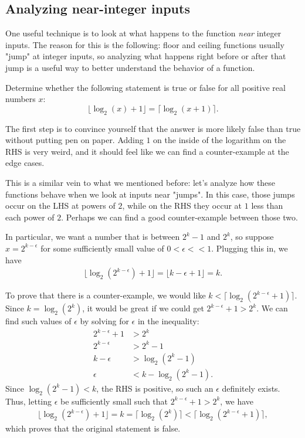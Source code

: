 \documentclass{article}
\begin{document}
\subsection{Analyzing near-integer inputs}

One useful technique is to look at what happens to the function \emph{near} integer inputs. The reason for this is the following: floor and ceiling functions usually "jump" at integer inputs, so analyzing what happens right before or after that jump is a useful way to better understand the behavior of a function.

\begin{exam}
Determine whether the following statement is true or false for all positive real numbers $x$:
\[ \lfloor \log_2 (x) + 1 \rfloor = \lceil \log_2 (x + 1) \rceil. \]
\end{exam}

\begin{sol}
The first step is to convince yourself that the answer is more likely false than true without putting pen on paper. Adding $1$ on the inside of the logarithm on the RHS is very weird, and it should feel like we can find a counter-example at the edge cases.

This is a similar vein to what we mentioned before: let's analyze how these functions behave when we look at inputs near "jumps". In this case, those jumps occur on the LHS at powers of $2$, while on the RHS they occur at $1$ less than each power of $2$. Perhaps we can find a good counter-example between those two.

In particular, we want a number that is between $2^k - 1$ and $2^k$, so suppose $x = 2^{k - \epsilon}$ for some sufficiently small value of $0  < \epsilon << 1$.  Plugging this in, we have
\begin{align*}
\lfloor \log_2 (2^{k - \epsilon}) + 1 \rfloor = \lfloor k - \epsilon + 1 \rfloor = k.
\end{align*}

To prove that there is a counter-example, we would like $k < \lceil \log_2 (2^{k - \epsilon} + 1) \rceil$. Since $k = \log_2 (2^k)$, it would be great if we could get $2^{k - \epsilon} + 1 > 2^k$. We can find such values of $\epsilon$ by solving for $\epsilon$ in the inequality:
\begin{align*}
2^{k - \epsilon} + 1 &> 2^k \\
2^{k - \epsilon} &> 2^k - 1 \\
k - \epsilon &> \log_2 (2^k - 1) \\
\epsilon &< k - \log_2 (2^k - 1).
\end{align*}
Since $\log_2 (2^k - 1) < k$, the RHS is positive, so such an $\epsilon$ definitely exists.  Thus, letting $\epsilon$ be sufficiently small such that $2^{k - \epsilon} + 1 > 2^k$, we have
\begin{align*}
\lfloor \log_2 (2^{k - \epsilon}) + 1 \rfloor = k = \lceil \log_2 (2^k) \rceil   <  \lceil \log_2 (2^{k - \epsilon} + 1) \rceil,
\end{align*}
which proves that the original statement is false.
\end{sol}
\end{document}
